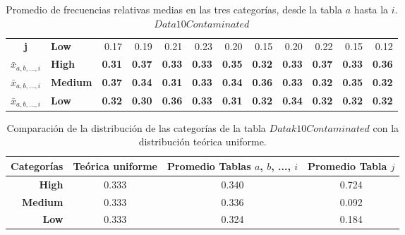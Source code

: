 \documentclass[mathematics,article,submit,moreauthors,pdftex]{mdpi}
\begin{document}
\begin{table}[H]
\begin{tabular}{@{}clrrrrrrrrrr@{}}
\textbf{j}     & \textbf{Low}       & 0.17                               & 0.19                               & 0.21                               & 0.23                               & 0.20                               & 0.15                               & 0.20                               & 0.22                               & 0.15                               & 0.12                                \\
\rowcolor[HTML]{D9D9D9} 
$\bar{x}_{a, b, ...,  i}$        & \textbf{High}      & \textbf{0.31}                      & \textbf{0.37}                      & \textbf{0.33}                      & \textbf{0.33}                      & \textbf{0.35}                      & \textbf{0.32}                      & \textbf{0.33}                      & \textbf{0.37}                      & \textbf{0.33}                      & \textbf{0.36}                       \\
\rowcolor[HTML]{D9D9D9} 
$\bar{x}_{a, b, ...,  i}$          & \textbf{Medium}    & \textbf{0.37}                      & \textbf{0.34}                      & \textbf{0.31}                      & \textbf{0.33}                      & \textbf{0.34}                      & \textbf{0.36}                      & \textbf{0.33}                      & \textbf{0.32}                      & \textbf{0.35}                      & \textbf{0.32}                       \\
\rowcolor[HTML]{D9D9D9} 
$\bar{x}_{a, b, ...,  i}$           & \textbf{Low}       & \textbf{0.32}                      & \textbf{0.30}                      & \textbf{0.36}                      & \textbf{0.33}                      & \textbf{0.31}                      & \textbf{0.32}                      & \textbf{0.34}                      & \textbf{0.32}                      & \textbf{0.32}                      & \textbf{0.32}                       \\ \bottomrule
\end{tabular}
\caption{Promedio de frecuencias relativas medias en las tres categorías, desde la tabla $a$ hasta la $i$. $Data10Contaminated$}

\label{tab:tablan}
\end{table}

\begin{table}[H]
\centering
\begin{tabular}{rccc}
\hline
\toprule

\textbf{Categorías} & \textbf{Teórica uniforme} & \textbf{Promedio Tablas $a$, $b$, ...,  $i$} & \textbf{Promedio Tabla $j$} \\ \midrule
\textbf{High}       & 0.333            & 0.340                & 0.724            \\ 
\textbf{Medium}     & 0.333            & 0.336                & 0.092            \\ 
\textbf{Low}        & 0.333            & 0.324                & 0.184            \\ \midrule
\end{tabular}
\caption{Comparación de la distribución de las categorías de la tabla $Datak10Contaminated$ con la distribución teórica uniforme.}
\label{tab:tablapromfreq}
\end{table}
\end{document}
